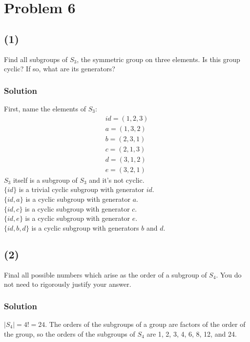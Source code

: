 \documentclass[fleqn]{article}
\begin{document}
    \section{Problem 6}
        
        \subsection{(1)}
        Find all subgroups of $S_3$, the symmetric group on three elements.  Is this group cyclic?  If so, what are its generators?
            
            \subsubsection{Solution}
            First, name the elements of $S_3$:
            \begin{align}
                id = (1, 2, 3) \\
                a = (1, 3, 2) \\
                b = (2, 3, 1) \\
                c = (2, 1, 3) \\
                d = (3, 1, 2) \\
                e = (3, 2, 1)
            \end{align}
            $S_3$ itself is a subgroup of $S_3$ and it's not cyclic. \\
            $\{id\}$ is a trivial cyclic subgroup with generator $id$. \\
            $\{id, a\}$ is a cyclic subgroup with generator $a$. \\
            $\{id, c\}$ is a cyclic subgroup with generator $c$. \\
            $\{id, e\}$ is a cyclic subgroup with generator $e$. \\
            $\{id, b, d\}$ is a cyclic subgroup with generators $b$ and $d$.
            
        \subsection{(2)}
        Final all possible numbers which arise as the order of a subgroup of $S_4$.  You do not need to rigorously justify your answer.
            
            \subsubsection{Solution}
            $|S_4| = 4! = 24$.  The orders of the subgroups of a group are factors of the order of the group, so the orders of the subgroups of $S_4$ are 1, 2, 3, 4, 6, 8, 12, and 24.
            
\end{document}
